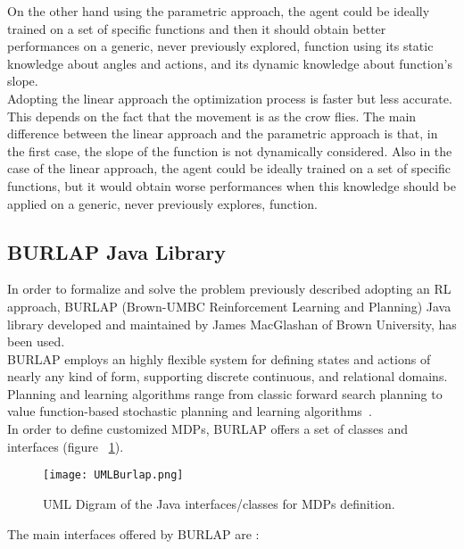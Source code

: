 On the other hand using the parametric approach, the agent could be ideally trained on a set of specific functions and then it should obtain better performances on a generic, never previously explored, function using its static knowledge about angles and actions, and its dynamic knowledge about function's slope. \\

Adopting the linear approach the optimization process is faster but less accurate. This depends on the fact that the movement is as the crow flies. The main difference between the linear approach and the parametric approach is that, in the first case, the slope of the function is not dynamically considered. Also in the case of the linear approach, the agent could be ideally trained on a set of specific functions, but it would obtain worse performances when this knowledge should be applied on a generic, never previously explores, function.

\subsection{BURLAP Java Library}

In order to formalize and solve the problem previously described adopting an RL approach, BURLAP (Brown-UMBC Reinforcement Learning and Planning) Java library developed and maintained by James MacGlashan of Brown University, has been used. \\

BURLAP employs an highly flexible system for defining states and actions of nearly any kind of form, supporting discrete continuous, and relational domains. Planning and learning algorithms range from classic forward search planning to value function-based stochastic planning and learning algorithms~\cite{BURLAPSite}. \\

In order to define customized MDPs, BURLAP offers a set of classes and interfaces (figure ~\ref{fig:UMLBurlap}).

\begin{figure} [h!]
	\texttt{[image: UMLBurlap.png]}
	\caption{UML Digram of the Java interfaces/classes for MDPs definition.}
	\label{fig:UMLBurlap}
\end{figure}

The main interfaces offered by BURLAP are :
	
